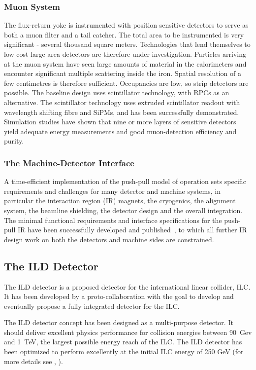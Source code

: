 \subsubsection{Muon System}
The flux-return yoke is instrumented with position sensitive detectors to
serve as both a muon filter and a tail catcher. The total area to be
instrumented is very significant - several thousand square meters. Technologies
that lend themselves to low-cost large-area detectors are therefore under
investigation. Particles arriving at the muon system have seen large amounts of
material in the calorimeters and encounter significant multiple scattering
inside the iron. Spatial resolution of a few centimetres is therefore
sufficient. Occupancies are low, so strip detectors are possible. The \sid
baseline design uses scintillator technology, with RPCs as an alternative. 
The scintillator technology uses extruded scintillator readout with wavelength 
shifting fibre and SiPMs, and has been successfully demonstrated. 
Simulation studies have shown that nine or more layers of sensitive detectors 
yield adequate energy measurements and good muon-detection efficiency and purity.


\subsubsection{The Machine-Detector Interface}
A time-efficient implementation of the push-pull model of
operation sets specific requirements and challenges for many detector and
machine systems, in particular the interaction region (IR) magnets, the
cryogenics, the alignment system, the beamline shielding, the detector design
and the overall integration. The minimal functional requirements and interface
specifications for the push-pull IR have been successfully developed and
published~\cite{Platform_Agreement,IR_Layout}, to which all further IR design
work on both the detectors and machine sides are constrained.

\subsection{The ILD Detector}
The ILD detector is a proposed detector for the international linear collider, ILC. It has been developed by a proto-collaboration with the goal to develop and eventually propose a fully integrated detector for the ILC. 

The ILD detector concept has been designed as a multi-purpose detector. It should deliver excellent physics performance for collision energies between 90~Gev and 1~TeV, the largest possible energy reach of the ILC. The ILD detector has been optimized to perform excellently at the initial ILC energy of 250 GeV (for more details see \cite{ild:bib:ILDloi}, \cite{ild:bib:ILDDBD}).

